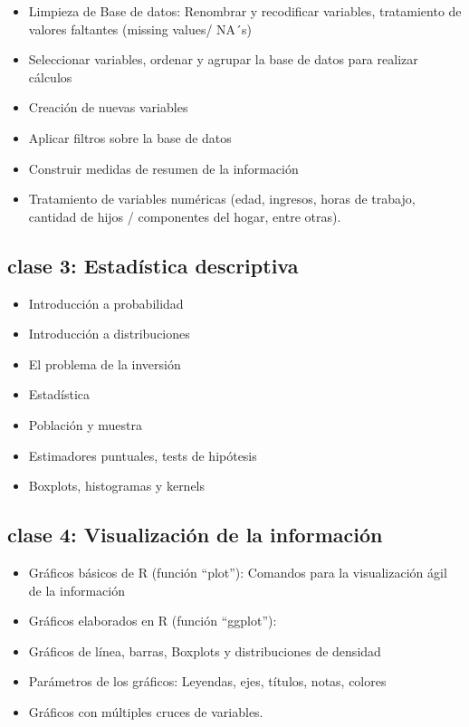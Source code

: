 \documentclass[]{book}
\providecommand{\tightlist}{%
  \setlength{\itemsep}{0pt}\setlength{\parskip}{0pt}}
\begin{document}
\begin{itemize}
\tightlist
\item
  Limpieza de Base de datos: Renombrar y recodificar variables, tratamiento de valores faltantes (missing values/ NA´s)
\item
  Seleccionar variables, ordenar y agrupar la base de datos para realizar cálculos
\item
  Creación de nuevas variables
\item
  Aplicar filtros sobre la base de datos
\item
  Construir medidas de resumen de la información
\item
  Tratamiento de variables numéricas (edad, ingresos, horas de trabajo, cantidad de hijos / componentes del hogar, entre otras).
\end{itemize}

\hypertarget{clase-3-estadistica-descriptiva}{%
\subsection{\texorpdfstring{\textbf{clase 3}: Estadística descriptiva}{clase 3: Estadística descriptiva}}\label{clase-3-estadistica-descriptiva}}

\begin{itemize}
\tightlist
\item
  Introducción a probabilidad
\item
  Introducción a distribuciones
\item
  El problema de la inversión
\item
  Estadística
\item
  Población y muestra
\item
  Estimadores puntuales, tests de hipótesis
\item
  Boxplots, histogramas y kernels
\end{itemize}

\hypertarget{clase-4-visualizacion-de-la-informacion}{%
\subsection{\texorpdfstring{\textbf{clase 4}: Visualización de la información}{clase 4: Visualización de la información}}\label{clase-4-visualizacion-de-la-informacion}}

\begin{itemize}
\tightlist
\item
  Gráficos básicos de R (función ``plot''): Comandos para la visualización ágil de la información
\item
  Gráficos elaborados en R (función ``ggplot''):
\item
  Gráficos de línea, barras, Boxplots y distribuciones de densidad
\item
  Parámetros de los gráficos: Leyendas, ejes, títulos, notas, colores
\item
  Gráficos con múltiples cruces de variables.
\end{itemize}
\end{document}
